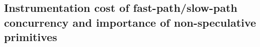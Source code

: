 \subsection{Instrumentation cost of fast-path/slow-path concurrency and importance of non-speculative primitives}